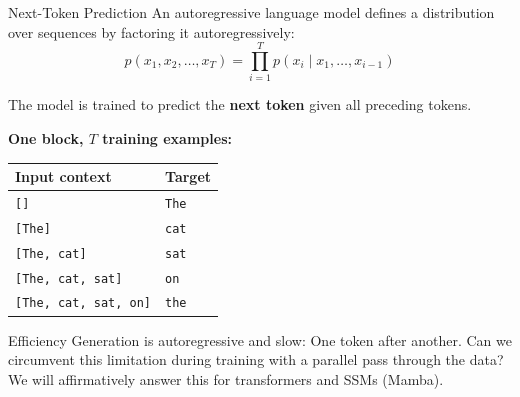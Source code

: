 \begin{frame}{Next-Token Prediction}
  An autoregressive language model defines a distribution over sequences by factoring it autoregressively:
  \[
    p(x_1, x_2, \ldots, x_T) = \prod_{i=1}^{T} p(x_i \mid x_1, \ldots, x_{i-1})
  \]

  The model is trained to predict the \textbf{next token} given all preceding tokens.

  \vspace{0.5em}
      \textbf{One block, $T$ training examples:}
      \begin{center}
        \begin{tabular}{ll}
          \textbf{Input context} & \textbf{Target} \\ \hline
          \texttt{[]}                 & \texttt{The} \\
          \texttt{[The]}              & \texttt{cat} \\
          \texttt{[The, cat]}         & \texttt{sat} \\
          \texttt{[The, cat, sat]}    & \texttt{on} \\
          \texttt{[The, cat, sat, on]}& \texttt{the} \\
        \end{tabular}
      \end{center}

      \begin{alertblock}{Efficiency}
        Generation is autoregressive and slow: One token after another.
          Can we circumvent this limitation during training with a parallel pass through the data?
          We will affirmatively answer this for transformers and SSMs (Mamba).
      \end{alertblock}
\end{frame}


